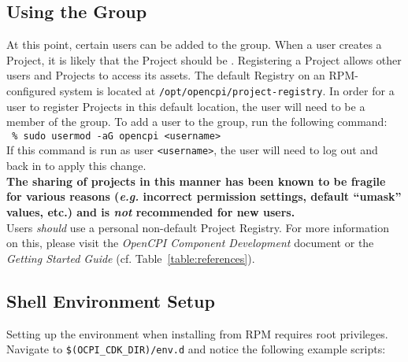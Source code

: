 \subsection{Using the  Group}
\label{subsec:opencpi_group}
At this point, certain users can be added to the  group. When a user creates a Project, it is likely that the Project should be . Registering a Project allows other users and Projects to access its assets. The default Registry on an RPM-configured system is located at \verb+/opt/opencpi/project-registry+. In order for a user to register Projects in this default location, the user will need to be a member of the  group. To add a user to the  group, run the following command:\\

\verb+ % sudo usermod -aG opencpi <username>+\\

If this command is run as user \verb+<username>+, the user will need to log out and back in to apply this change.\\

\textbf{The sharing of projects in this manner has been known to be fragile for various reasons (\textit{e.g.} incorrect permission settings, default ``umask'' values, etc.) and is \textit{not} recommended for new users.} \\

Users \textit{should} use a personal non-default Project Registry. For more information on this, please visit the \textit{OpenCPI Component Development} document or the \textit{Getting Started Guide} (cf. Table~\ref{table:references}).

\subsection{Shell Environment Setup} \label{setenv}
\label{subsec:setup_environment}
\begin{center}
\end{center}

Setting up the environment when installing from RPM requires root privileges. Navigate to \verb+$(OCPI_CDK_DIR)/env.d+ and notice the following example scripts:

